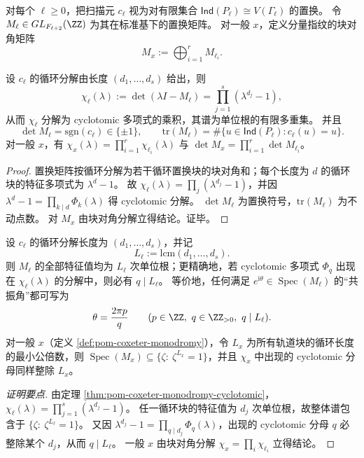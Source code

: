 \begin{definition}[置换单odromy 矩阵]\label{def:pom-coxeter-monodromy}
对每个 \(\ell\ge 0\)，把扫描元 \(c_\ell\) 视为对有限集合 \(\mathsf{Ind}(P_\ell)\cong V(\Gamma_\ell)\) 的置换。
令 \(M_\ell\in GL_{F_{\ell+2}}(\ZZ)\) 为其在标准基下的置换矩阵。
对一般 \(x\)，定义分量指纹的块对角矩阵
\[
M_x:=\bigoplus_{i=1}^r M_{\ell_i}.
\]
\end{definition}

\begin{theorem}\label{thm:pom-coxeter-monodromy-cyclotomic}
设 \(c_\ell\) 的循环分解由长度 \((d_1,\dots,d_s)\) 给出，则
\[
\chi_\ell(\lambda):=\det(\lambda I-M_\ell)=\prod_{j=1}^s (\lambda^{d_j}-1),
\]
从而 \(\chi_\ell\) 分解为 cyclotomic 多项式的乘积，其谱为单位根的有限多重集。
并且
\[
\det M_\ell=\mathrm{sgn}(c_\ell)\in\{\pm 1\},\qquad
\mathrm{tr}(M_\ell)=\#\{u\in \mathsf{Ind}(P_\ell): c_\ell(u)=u\}.
\]
对一般 \(x\)，有 \(\chi_x(\lambda)=\prod_{i=1}^r \chi_{\ell_i}(\lambda)\) 与 \(\det M_x=\prod_{i=1}^r \det M_{\ell_i}\)。
\end{theorem}
\begin{proof}
置换矩阵按循环分解为若干循环置换块的块对角和；每个长度为 \(d\) 的循环块的特征多项式为 \(\lambda^d-1\)。
故 \(\chi_\ell(\lambda)=\prod_j(\lambda^{d_j}-1)\)，并因 \(\lambda^d-1=\prod_{k\mid d}\Phi_k(\lambda)\) 得 cyclotomic 分解。
\(\det M_\ell\) 为置换符号，\(\mathrm{tr}(M_\ell)\) 为不动点数。
对 \(M_x\) 由块对角分解立得结论。证毕。
\end{proof}

\begin{corollary}\label{cor:pom-coxeter-monodromy-lcm-quantization}
设 \(c_\ell\) 的循环分解长度为 \((d_1,\dots,d_s)\)，并记
\[
L_\ell:=\mathrm{lcm}(d_1,\dots,d_s).
\]
则 \(M_\ell\) 的全部特征值均为 \(L_\ell\) 次单位根；更精确地，若 cyclotomic 多项式 \(\Phi_q\) 出现在 \(\chi_\ell(\lambda)\) 的分解中，则必有 \(q\mid L_\ell\)。
等价地，任何满足 \(e^{\mathrm{i}\theta}\in\operatorname{Spec}(M_\ell)\) 的“共振角”都可写为
\[
\theta=\frac{2\pi p}{q}\qquad(p\in\ZZ,\ q\in\ZZ_{>0},\ q\mid L_\ell).
\]
对一般 \(x\)（定义 \ref{def:pom-coxeter-monodromy}），令 \(L_x\) 为所有轨道块的循环长度的最小公倍数，则 \(\operatorname{Spec}(M_x)\subseteq\{\zeta:\ \zeta^{L_x}=1\}\)，并且 \(\chi_x\) 中出现的 cyclotomic 分母同样整除 \(L_x\)。
\end{corollary}
\begin{proof}[证明要点]
由定理 \ref{thm:pom-coxeter-monodromy-cyclotomic}，\(\chi_\ell(\lambda)=\prod_{j=1}^s(\lambda^{d_j}-1)\)。
任一循环块的特征值为 \(d_j\) 次单位根，故整体谱包含于 \(\{\zeta:\ \zeta^{L_\ell}=1\}\)。
又因 \(\lambda^{d_j}-1=\prod_{q\mid d_j}\Phi_q(\lambda)\)，出现的 cyclotomic 分母 \(q\) 必整除某个 \(d_j\)，从而 \(q\mid L_\ell\)。
一般 \(x\) 由块对角分解 \(\chi_x=\prod_i\chi_{\ell_i}\) 立得结论。
\end{proof}


